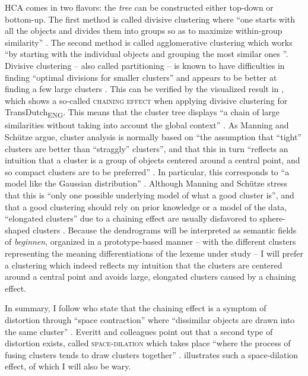 HCA comes in two flavors: the \textit{tree} can be constructed either top-down or bottom-up. The first method is called divisive clustering where “one starts with all the objects and divides them into groups so as to maximize within-group similarity” \citep[501]{manning_foundations_1999}. The second method is called agglomerative clustering which works “by starting with the individual objects and grouping the most similar ones \citep[500--501]{manning_foundations_1999}”. Divisive clustering – also called partitioning – is known to have difficulties in finding “optimal divisions for smaller clusters” and appears to be better at finding a few large clusters \citep[138]{baayen_analyzing_2008}. This can be verified by the visualized result in , which shows a so-called \textsc{chaining effect} when applying divisive clustering for TransDutch\textsubscript{ENG}. This means that the cluster tree displays “a chain of large similarities without taking into account the global context” \citep[504]{manning_foundations_1999}. As Manning and Schütze argue, cluster analysis is normally based on “the assumption that ``tight'' clusters are better than ``straggly'' clusters”, and that this in turn “reflects an intuition that a cluster is a group of objects centered around a central point, and so compact clusters are to be preferred” \citep[506]{manning_foundations_1999}. In particular, this corresponds to “a model like the Gaussian distribution” \citep[506]{manning_foundations_1999}. Although Manning and Schütze stress that this is “only one possible underlying model of what a good cluster is”, and that a good clustering should rely on prior knowledge or a model of the data, “elongated clusters” due to a chaining effect are usually disfavored to sphere-shaped clusters \citep[506]{manning_foundations_1999}. Because the dendrograms will be interpreted as semantic fields of \textit{beginnen}, organized in a prototype-based manner – with the different clusters representing the meaning differentiations of the lexeme under study – I will prefer a clustering which indeed reflects my intuition that the clusters are centered around a central point and avoids large, elongated clusters caused by a chaining effect.

In summary, I follow \citet[92]{everitt_cluster_2011} who state that the chaining effect is a symptom of distortion through “space contraction” where “dissimilar objects are drawn into the same cluster” \citep[92]{everitt_cluster_2011}. Everitt and colleagues point out that a second type of distortion exists, called \textsc{space-dilation} which takes place “where the process of fusing clusters tends to draw clusters together” \citet[92]{everitt_cluster_2011}.  illustrates such a space-dilation effect, of which I will also be wary.


